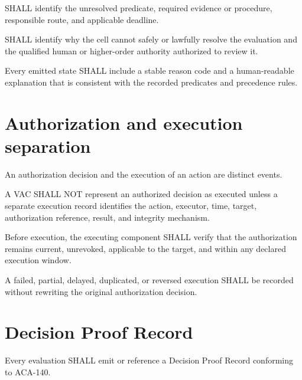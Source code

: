 \begin{requirement}[ACA-120-031]
 SHALL identify the unresolved predicate, required evidence or
procedure, responsible route, and applicable deadline.
\end{requirement}

\begin{requirement}[ACA-120-032]
 SHALL identify why the cell cannot safely or lawfully resolve
the evaluation and the qualified human or higher-order authority authorized to
review it.
\end{requirement}

\begin{requirement}[ACA-120-033]
Every emitted state SHALL include a stable reason code and a human-readable
explanation that is consistent with the recorded predicates and precedence
rules.
\end{requirement}

\section{Authorization and execution separation}
An authorization decision and the execution of an action are distinct events.

\begin{requirement}[ACA-120-034]
A VAC SHALL NOT represent an authorized decision as executed unless a separate
execution record identifies the action, executor, time, target, authorization
reference, result, and integrity mechanism.
\end{requirement}

\begin{requirement}[ACA-120-035]
Before execution, the executing component SHALL verify that the authorization
remains current, unrevoked, applicable to the target, and within any declared
execution window.
\end{requirement}

\begin{requirement}[ACA-120-036]
A failed, partial, delayed, duplicated, or reversed execution SHALL be recorded
without rewriting the original authorization decision.
\end{requirement}

\section{Decision Proof Record}
Every evaluation SHALL emit or reference a Decision Proof Record conforming to
ACA-140.

